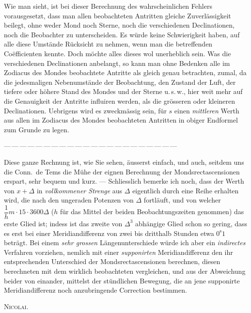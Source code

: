 Wie man sieht, ist bei dieser Berechnung des wahrscheinlichen Fehlers vorausgesetzt, dass man allen
beobachteten Antritten gleiche Zuverlässigkeit beilegt, ohne weder Mond noch Sterne, noch die
verschiedenen Declinationen, noch die Beobachter zu unterscheiden. Es würde keine Schwierigkeit
haben, auf alle diese Umstände Rücksicht zu nehmen, wenn man die betreffenden Coëfficienten kennte.
Doch möchte alles dieses wol unerheblich sein. Was die verschiedenen Declinationen anbelangt, so
kann man ohne Bedenken alle im Zodiacus des Mondes beobachtete Antritte als gleich genau betrachten,
zumal, da die jedesmaligen Nebenumstände der Beobachtung, den Zustand der Luft, der tiefere oder
höhere Stand des Mondes und der Sterne u.\,s.\,w., hier weit mehr auf die Genauigkeit der Antritte
influiren werden, als die grösseren oder kleineren Declinationen. Uebrigens wird es zweckmässig sein,
für $s$ einen \emph{mittleren} Werth aus allen im Zodiacus des Mondes beobachteten Antritten in
obiger Endformel zum Grunde zu legen.

\begin{center}
{\small ---\,---\,---\,---\,---\,---\,---\,---\,---\,---\,---\,---\,---\,---\,---\,---\,---\,---\,---\,---\,---\,---}
\end{center}

Diese ganze Rechnung ist, wie Sie sehen, äusserst einfach, und auch, seitdem uns die Conn.\ de Tems
die Mühe der eignen Berechnung der Mondsrectascensionen erspart, sehr bequem und kurz. ---
Schliesslich bemerke ich noch, dass der Werth von $x+\Delta$ in \emph{vollkommener Strenge} aus
$\Delta$ eigentlich durch eine Reihe erhalten wird, die nach den ungeraden Potenzen von $\Delta$
fortläuft, und von welcher $\dfrac{1}{h}m\cdot15\cdot3600\Delta$ ($h$ für das Mittel der beiden
Beobachtungszeiten genommen) das erste Glied ist; indess ist das zweite von $\Delta^3$ abhängige
Glied schon so gering, dass es erst bei einer Meridiandifferenz von zwei bis dritthalb Stunden etwa
$0^{\mathrm{s}}1$ beträgt. 
Bei einem \emph{sehr grossen} Längenunterschiede würde ich aber ein \emph{indirectes} Verfahren
vorziehen, nemlich mit einer \emph{supponirten} Meridiandifferenz den ihr entsprechenden Unterschied
der Mondsrectascensionen berechnen, diesen berechneten mit dem wirklich beobachteten vergleichen, und
aus der Abweichung beider von einander, mittelst der stündlichen Bewegung, die an jene supponirte
Meridiandifferenz noch anzubringende Correction bestimmen.

\begin{flushright}
\textsc{Nicolai.}
\end{flushright}
